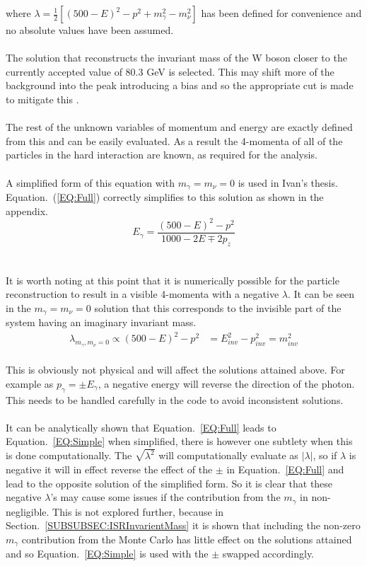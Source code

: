 where $ {\lambda} = \frac{1}{2}[{(500 - E)}^2 - {p}^{2} + {m}_{\gamma}^{2} - {m}_{\nu}^{2}] $ has been defined for convenience and no absolute values have been assumed.
\\\\
The solution that reconstructs the invariant mass of the W boson closer to the currently accepted value of 80.3 GeV \cite{pdgLive} is selected.  This may shift more of the background into the peak introducing a bias and so the appropriate cut is made to mitigate this \cite{Marchesini:2011aka}.
\\\\
The rest of the unknown variables of momentum and energy are exactly defined from this and can be easily evaluated. As a result the 4-momenta of all of the particles in the hard interaction are known, as required for the analysis.
\\\\
A simplified form of this equation with ${m}_{\gamma} = {m}_{\nu} = 0$ is used in Ivan's thesis. Equation.~(\ref{EQ:Full}) correctly simplifies to this solution as shown in the appendix.
 \begin{equation}
     \label{EQ:Simple}
  {E}_{\gamma} = \frac{ {(500 - E)}^2 - {p}^{2}}{1000 -2 E  \mp 2{p}_{z}}
\end{equation}
\\\\
 It is worth noting at this point that it is numerically possible for the particle reconstruction to result in a visible 4-momenta with a negative $\lambda$. It can be seen in the ${m}_{\gamma} = {m}_{\nu} =0$ solution that this corresponds to the invisible part of the system having an imaginary invariant mass.
\\
 \begin{align}
     \label{EQ:invariantMassNegative}
     {\lambda}_{{m}_{\gamma}, {m}_{\nu} = 0} \propto {(500 - E)}^2 - {p}^{2} &= {E}_{inv}^2 - {p}_{inv}^{2} = {m}_{inv}^2
 \end{align}
\\
This is obviously not physical and will affect the solutions attained above. For example as ${p}_{\gamma}= \pm {E}_{\gamma}$, a negative energy will reverse the direction of the photon. This needs to be handled carefully in the code to avoid inconsistent solutions.
\\\\
It can be analytically shown that Equation.~\ref{EQ:Full} leads to Equation.~\ref{EQ:Simple} when simplified, there is however one subtlety when this is done computationally. The $\sqrt{ {\lambda}^{2}}$ will computationally evaluate as $|{\lambda}|$, so if $\lambda$ is negative it will in effect reverse the effect of the $\pm$ in Equation.~\ref{EQ:Full} and lead to the opposite solution of the simplified form. So it is clear that these negative $\lambda$'s may cause some issues if the contribution from the ${m}_{\gamma}$ in non-negligible. This is not explored further, because in Section.~\ref{SUBSUBSEC:ISRInvarientMass} it is shown that including the non-zero ${m}_{\gamma}$ contribution from the Monte Carlo has little effect on the solutions attained and so Equation.~\ref{EQ:Simple} is used with the $\pm$ swapped accordingly.
